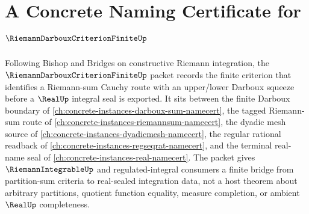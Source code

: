 \chapter{A Concrete Naming Certificate for $\RiemannDarbouxCriterionFiniteUp$}
\label{ch:concrete-instances-riemann-darboux-criterion-finite-namecert}

Following Bishop and Bridges on constructive Riemann integration, the $\RiemannDarbouxCriterionFiniteUp$ packet records the finite criterion that identifies a Riemann-sum Cauchy route with an upper/lower Darboux squeeze before a $\RealUp$ integral seal is exported. It sits between the finite Darboux boundary of \autoref{ch:concrete-instances-darboux-sum-namecert}, the tagged Riemann-sum route of \autoref{ch:concrete-instances-riemannsum-namecert}, the dyadic mesh source of \autoref{ch:concrete-instances-dyadicmesh-namecert}, the regular rational readback of \autoref{ch:concrete-instances-regseqrat-namecert}, and the terminal real-name seal of \autoref{ch:concrete-instances-real-namecert}. The packet gives $\RiemannIntegrableUp$ and regulated-integral consumers a finite bridge from partition-sum criteria to real-sealed integration data, not a host theorem about arbitrary partitions, quotient function equality, measure completion, or ambient $\RealUp$ completeness.

